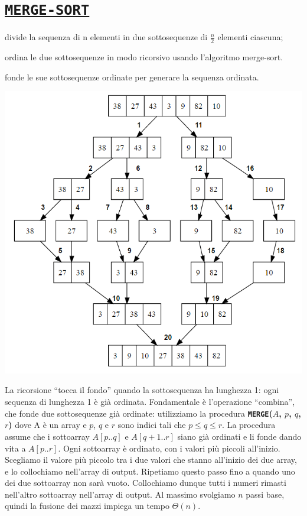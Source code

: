 \documentclass[11pt,a4paper]{article}
\begin{document}
\section{\href{https://upload.wikimedia.org/wikipedia/commons/c/cc/Merge-sort-example-300px.gif}{\texttt{MERGE-SORT}}}
\begin{description}[leftmargin=*]
  \item[Divide] divide la sequenza di n elementi in due sottosequenze di $\frac{n}{2}$ elementi ciascuna;
  \item[Impera] ordina le due sottosequenze in modo ricorsivo usando l’algoritmo merge-sort.
  \item[Combina] fonde le sue sottosequenze ordinate per generare la sequenza ordinata.
\end{description}\medskip\medskip
\begin{center}
      \includegraphics[scale=0.5]{img/mergesort.png}
\end{center}
\medskip\medskip\medskip
La ricorsione “tocca il fondo” quando la sottosequenza ha
lunghezza 1: ogni sequenza di lunghezza 1 è già ordinata.
Fondamentale è l’operazione “combina”, che fonde due
sottosequenze già ordinate: utilizziamo la procedura
\textbf{\texttt{MERGE}($A$, $p$, $q$, $r$)} dove A è un array e $p$, $q$ e $r$ sono indici tali
che $p \leq q \leq r$.
La procedura assume che i sottoarray $A[p..q]$ e $A[q+1..r]$
siano già ordinati e li fonde dando vita a $A[p..r]$.
Ogni sottoarray è ordinato, con i valori più piccoli all’inizio.
Scegliamo il valore più piccolo tra i due valori che stanno
all’inizio dei due array, e lo collochiamo nell’array di output.
Ripetiamo questo passo fino a quando uno dei due
sottoarray non sarà vuoto. Collochiamo dunque tutti i
numeri rimasti nell’altro sottoarray nell’array di output.
Al massimo svolgiamo $n$ passi base, quindi la fusione dei
mazzi impiega un tempo $\Theta(n)$.
\end{document}
